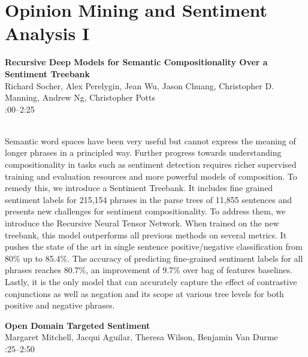 \documentclass[twoside,makeidx]{book}
\renewcommand{\normalsize}{\fontsize{8}{9}\selectfont}
\renewcommand{\small}{\fontsize{7}{8}\selectfont}
\begin{document}
\section{Opinion Mining and Sentiment Analysis I}
\vspace{-1em}
\par\vspace{2em}\noindent%
\begin{minipage}{\linewidth}%
\begin{center}
\textbf{\normalsize Recursive Deep Models for Semantic Compositionality Over a Sentiment Treebank}\\
\normalsize  Richard Socher,  Alex Perelygin,  Jean Wu,  Jason Chuang,  Christopher D. Manning,  Andrew Ng,  Christopher Potts\\
{\small 2:00--2:25}\\
\end{center}
\end{minipage}\\[0.5em]
\nopagebreak%
\noindent%
{\small Semantic word spaces have been very useful but cannot express the meaning of longer phrases in a principled way. Further progress towards understanding compositionality in tasks such as sentiment detection requires richer supervised training and evaluation resources and more powerful models of composition. To remedy this, we introduce a Sentiment Treebank. It includes fine grained sentiment labels for 215,154 phrases in the parse trees of 11,855 sentences and presents new challenges for sentiment compositionality. To address them, we introduce the Recursive Neural Tensor Network. When trained on the new treebank, this model outperforms all previous methods on several metrics. It pushes the state of the art in single sentence positive/negative classification from 80\% up to 85.4\%. The accuracy of predicting fine-grained sentiment labels for all phrases reaches 80.7\%, an improvement of 9.7\% over bag of features baselines. Lastly, it is the only model that can accurately capture the effect of contrastive conjunctions as well as negation and its scope at various tree levels for both positive and negative phrases.}
\par\vspace{2em}\noindent%
\begin{minipage}{\linewidth}%
\begin{center}
\textbf{\normalsize Open Domain Targeted Sentiment}\\
\normalsize  Margaret Mitchell,  Jacqui Aguilar,  Theresa Wilson,  Benjamin Van Durme\\
{\small 2:25--2:50}\\
\end{center}
\end{minipage}\\[0.5em]
\end{document}
